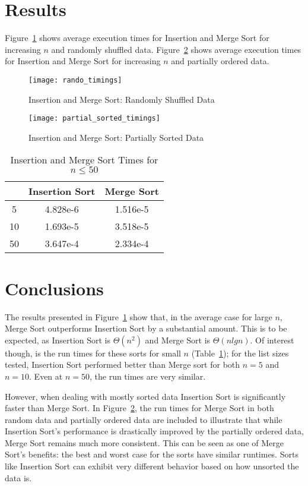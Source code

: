 \documentclass[10pt, letterpaper]{article}
\begin{document}
	\section{Results}
	Figure~\ref{rando} shows average execution times for Insertion and Merge Sort for increasing $n$ and randomly shuffled data.  Figure~\ref{partial} shows average execution times for Insertion and Merge Sort for increasing $n$ and partially ordered data.
	\begin{figure}[htpb!]
		\centering
		\texttt{[image: rando\_timings]}
		\caption{\label{rando}Insertion and Merge Sort: Randomly Shuffled Data}
	\end{figure}
	\begin{figure}[htpb!]
		\centering
		\texttt{[image: partial\_sorted\_timings]}
		\caption{\label{partial}Insertion and Merge Sort: Partially Sorted Data}
		\end{figure}
\begin{table}
	\centering
		\begin{tabular}{c|cc}
\rowcolors{2}{gray!25}{white}
& Insertion Sort & Merge Sort\\
\hline
5 & 4.828e-6&1.516e-5 \\
10 &1.693e-5 &3.518e-5 \\
50 & 3.647e-4&2.334e-4
	\end{tabular}
	\caption{\label{smalln}Insertion and Merge Sort Times for $n\leq50$}
\end{table}

	\section{Conclusions}
	The results presented in Figure~\ref{rando} show that, in the average case for large $n$, Merge Sort outperforms Insertion Sort by a substantial amount.  This is to be expected, as Insertion Sort is $\Theta(n^2)$ and Merge Sort is $\Theta(nlgn)$.  Of interest though, is the run times for these sorts for small $n$ (Table~\ref{smalln});  for the list sizes tested, Insertion Sort performed better than Merge sort for both $n=5$ and $n=10$.  Even at $n=50$, the run times are very similar.
	
	However, when dealing with mostly sorted data Insertion Sort is significantly faster than Merge Sort.  In Figure~\ref{partial}, the run times for Merge Sort in both random data and partially ordered data are included to illustrate that while Insertion Sort's performance is drastically improved by the partially ordered data, Merge Sort remains much more consistent.  This can be seen as one of Merge Sort's benefits: the best and worst case for the sorts have similar runtimes.  Sorts like Insertion Sort can exhibit very different behavior based on how unsorted the data is.
	
\end{document}
